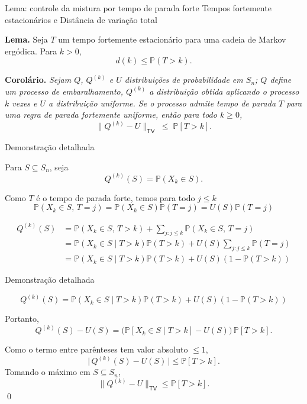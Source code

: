 \documentclass{beamer}
\def\Pr{\mathbb P}
\begin{document}
\begin{frame}{Lema: controle da mistura por tempo de parada forte}
  {Tempos fortemente estacionários e Distância de variação total}

  
  \textbf{Lema.} Seja \(T\) um tempo fortemente estacionário para uma
  cadeia de Markov ergódica. Para \(k > 0\),
  \[
    d(k) \le \Pr(T > k).
  \]
  
  \textbf{Corolário.}  \textit{Sejam $Q$, $Q^{(k)}$ e $U$ distribuições
    de probabilidade em $S_n$; $Q$ define um processo de
    embaralhamento, $Q^{(k)}$ a distribuição obtida aplicando o
    processo $k$ vezes e $U$ a distribuição uniforme. Se o processo
    admite tempo de parada $T$ para uma \textrm{regra de parada
      fortemente uniforme}, então para todo $k \ge 0$,}
  \[
    \| Q^{(k)} - U \|_{{\textsf{TV}}} \;\le\; \Pr[T > k].
  \]
  
 
\end{frame}
\begin{frame}{Demonstração detalhada}

 

  Para $S \subseteq S_n$, seja
  \[
    Q^{(k)}(S) = \Pr(X_k \in S).
  \]
  
  
  Como $T$ é o tempo de parada forte,
  temos para todo $j \le k$
  $$\Pr(X_k \in S,\, T = j) =\Pr(X_k \in S)\Pr(T = j) = U(S)\Pr(T = j)$$
  
  
  \[
    \begin{aligned}
      Q^{(k)}(S) 
      &= \Pr(X_k \in S,\, T>k)
      + \sum_{j: j \le k} \Pr(X_k \in S,\, T=j)  \\[0.5em]%
      &=  \Pr(X_k \in S \mid T>k) \Pr(T>k)
      + U(S)\!\sum_{j: j \le k} \Pr(T=j)\\[0.5em]
      &= \Pr(X_k \in S \mid T>k)\Pr(T>k)
      + U(S)(1-\Pr(T>k)) 
    \end{aligned}
  \]
  
\end{frame}

\begin{frame}{Demonstração detalhada}

   \[
     Q^{(k)}(S)= \Pr(X_k \in S \mid T>k)\Pr(T>k) + U(S)(1-\Pr(T>k))
   \]
   
   
   Portanto,
   \[
     Q^{(k)}(S) - U(S) = \bigl(\Pr[X_k \in S \mid T>k] -
     U(S)\bigr)\,\Pr[T>k].
   \]
   
   Como o termo entre parênteses tem valor absoluto $\le 1$,
   \[
     \vert \,Q^{(k)}(S) - U(S)\,\vert  \le \Pr[T > k].
   \]
   Tomando o máximo em $S\subseteq S_n$,
   \[
     \boxed{\|Q^{(k)} - U\|_{{\textsf{TV}}} \le \Pr[T>k].}
   \]\qed
 \end{frame}
 
\end{document}
